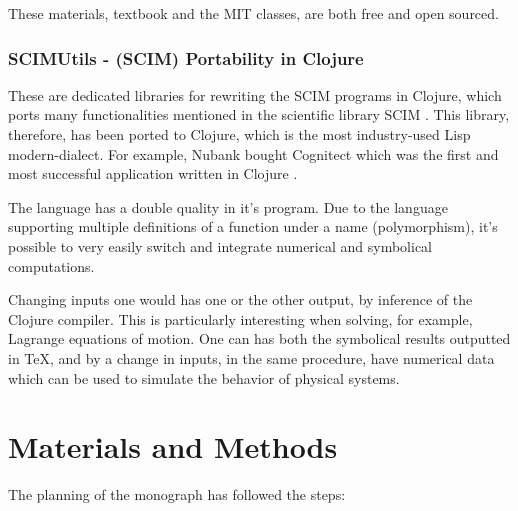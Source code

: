 \documentclass[
12pt,				%
openright,			%
oneside,			%
a4paper,			%
brazil,				%
english,			  %
]{abntex2}
\begin{document}
These materials, textbook and the MIT classes, are both free and open
sourced.
\subsection{SCIMUtils - (SCIM) Portability in Clojure}
\label{sec:scimutils}

These are dedicated libraries for rewriting the SCIM programs in
Clojure, which ports many functionalities mentioned in the scientific
library SCIM \cite{sicmutils2016github}. This library, therefore, has
been ported to Clojure, which is the most industry-used Lisp
modern-dialect. For example, Nubank bought Cognitect which was the
first and most successful application written in Clojure \cite{clojure2020}. 

The language has a double quality in it's program. Due to the language
supporting multiple definitions of a function under a name
(polymorphism), it's possible to very easily switch and integrate
numerical and symbolical computations.

Changing inputs one would has one or the other output, by inference
of the Clojure compiler. This is particularly interesting when
solving, for example, Lagrange equations of motion. One can has both
the symbolical results outputted in \TeX{}, and by a change in inputs,
in the same procedure, have numerical data which can be used to
simulate the behavior of physical systems. 


\chapter{Materials and Methods}
The planning of the monograph has followed the steps:
\end{document}
